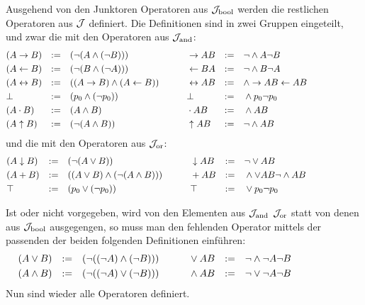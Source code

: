 Ausgehend von den Junktoren \textbzw Operatoren aus $\mathcal{J}_{\mathrm{bool}}$ werden die restlichen Operatoren aus $\mathcal{J}$ definiert. Die Definitionen sind in zwei Gruppen eingeteilt, und zwar die mit den Operatoren aus $\mathcal{J}_{\mathrm{and}}$:
\begin{align}
&                (A \rightarrow B)  &:= & & & (\lnot (A \land (\lnot B)))
& &&&& &   \rightarrow A B &:= & & & \lnot \land A \lnot B
\label{def:imp}
\\
&                (A \leftarrow B)  &:= & & & (\lnot (B \land (\lnot A)))
& &&&& &   \leftarrow B A &:= & & & \lnot \land B \lnot A
\label{def:rep}
\\
&              (A \leftrightarrow B)  &:= & & & ((A\rightarrow B)\land(A\leftarrow B))
& &&&& & \leftrightarrow A B &:= & & & \land \rightarrow A B \leftarrow A B
\label{def:equiv}
\\
&                     \bot & := & & & (p_0 \land (\lnot p_0))
& &&&& &     \bot & := & & & \land p_0 \lnot p_0
\label{def:false}
\\
&               (A \cdot B)  & := & & & (A \land B)
& &&&& &  \cdot A B & := & & & \land A B
\label{def:mult}
\\
&               (A \uparrow B)  &:= & & & (\lnot (A \land B ))
& &&&& &  \uparrow A B &:= & & & \lnot \land A B
\label{def:nand}
&&&&&&&&&&
\end{align}
und die mit den Operatoren aus $\mathcal{J}_{\mathrm{or}}$:
\begin{align}
&                (A \downarrow B)  & := & & & (\lnot (A \lor B))
& &&&& &   \downarrow A B & := & & & \lnot \lor A B
\label{def:nor}
\\
& (A + B) & := & & & ((A\lor B)\land(\lnot(A\land B)))
& &&&& &   + A B & := & & & \land\lor A B\lnot\land A B
\label{def:add}
\\
&                      \top & := & & & (p_0 \lor (\lnot p_0))
& &&&& &      \top & := & & & \lor p_0 \lnot p_0
\label{def:true}
&&&&&&&&&&
\end{align}

Ist \symqt{$\lor$} oder \symqt{$\land$} nicht vorgegeben, \textdh wird von den Elementen aus $\mathcal{J}_{\mathrm{and}}$ \textbzw $\mathcal{J}_{\mathrm{or}}$ statt von denen aus $\mathcal{J}_{\mathrm{bool}}$ ausgegengen, so muss man den fehlenden Operator mittels der passenden der beiden folgenden Definitionen einführen:
\begin{align}
&          (A \lor B) & := & & & (\lnot ((\lnot A) \land (\lnot B)))
& &&&& & \lor  A B & := & & & \lnot \land \lnot A \lnot B
\label{def:orand}
\\
&          (A \land B) & := & & & (\lnot ((\lnot A) \lor (\lnot B)))
& &&&& & \land A B & := & & & \lnot \lor \lnot A \lnot B
\label{def:andor}
&&&&&&&&&&
\end{align}
Nun sind wieder alle Operatoren definiert.

